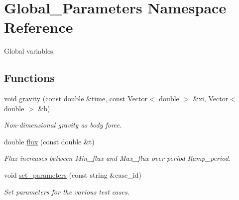 \hypertarget{namespaceGlobal__Parameters}{}\section{Global\+\_\+\+Parameters Namespace Reference}
\label{namespaceGlobal__Parameters}


Global variables.  


\subsection*{Functions}
\begin{DoxyCompactItemize}
\item 
void \hyperlink{namespaceGlobal__Parameters_a200109847bf4cc26da4d00e8d68d569e}{gravity} (const double \&time, const Vector$<$ double $>$ \&xi, Vector$<$ double $>$ \&b)
\begin{DoxyCompactList}\small\item\em Non-\/dimensional gravity as body force. \end{DoxyCompactList}\item 
double \hyperlink{namespaceGlobal__Parameters_a536aa5314a6cdb36af852e9513351d55}{flux} (const double \&t)
\begin{DoxyCompactList}\small\item\em Flux increases between Min\+\_\+flux and Max\+\_\+flux over period Ramp\+\_\+period. \end{DoxyCompactList}\item 
void \hyperlink{namespaceGlobal__Parameters_a8c333f9041cad78d5c0160a8e2c169f5}{set\+\_\+parameters} (const string \&case\+\_\+id)
\begin{DoxyCompactList}\small\item\em Set parameters for the various test cases. \end{DoxyCompactList}\end{DoxyCompactItemize}
